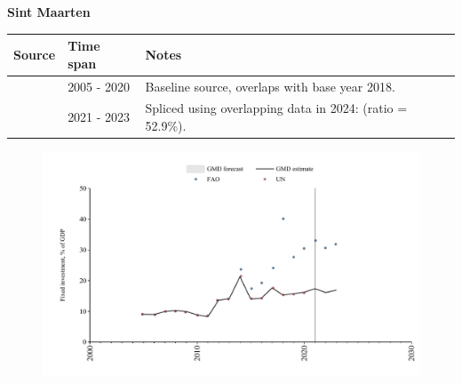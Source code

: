 \documentclass[12pt,a4paper,landscape]{article}
\begin{document}
\begin{adjustbox}{max totalsize={\paperwidth}{\paperheight},center}
\begin{minipage}[t][\textheight][t]{\textwidth}
\vspace*{0.5cm}
{}
\begin{center}
{\Large\bfseries Sint Maarten}
\end{center}
\vspace{0.5cm}
\begin{table}[H]
\centering
\small
\begin{tabular}{|l|l|l|}
\hline
\textbf{Source} & \textbf{Time span} & \textbf{Notes} \\
\hline
\rowcolor{white}\cite{UN}& 2005 - 2020 &Baseline source, overlaps with base year 2018.\\
\rowcolor{lightgray}\cite{FAO}& 2021 - 2023 &Spliced using overlapping data in 2024: (ratio = 52.9\%).\\
\hline
\end{tabular}
\end{table}
\begin{figure}[H]
\centering
\includegraphics[width=\textwidth,height=0.6\textheight,keepaspectratio]{graphs/SXM_finv_GDP.pdf}
\end{figure}
\end{minipage}
\end{adjustbox}
\end{document}
